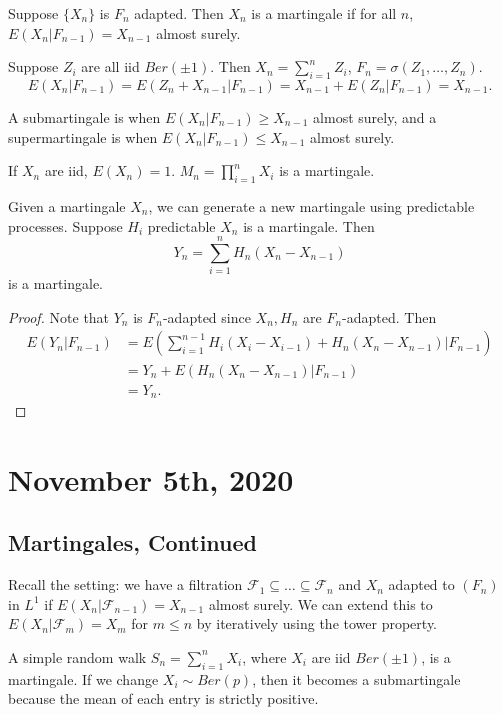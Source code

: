 \documentclass[11pt]{scrartcl}
\let \mc \mathcal
\begin{document}
\begin{definition} Suppose $\{X_n\}$ is $F_n$ adapted.  Then $X_n$ is a martingale if for all $n$, $E(X_n|F_{n-1}) = X_{n-1}$ almost surely.
\end{definition}
\begin{example}  Suppose $Z_i$ are all iid $Ber(\pm 1)$.  Then $X_n = \sum_{i=1}^n Z_i$, $F_n = \sigma(Z_1, \dots, Z_n)$.  
$$E(X_n|F_{n-1}) = E(Z_n + X_{n-1}|F_{n-1}) = X_{n-1} + E(Z_n|F_{n-1}) = X_{n-1}.$$
\end{example}

\begin{definition} A submartingale is when $E(X_n|F_{n-1}) \ge X_{n-1}$ almost surely, and a supermartingale is when $E(X_n | F_{n-1}) \le X_{n-1}$ almost surely.
\end{definition}
\begin{example} If $X_n$ are iid, $E(X_n) = 1$.  $M_n = \prod_{i=1}^n X_i$ is a martingale.
\end{example}
\begin{thm}
Given a martingale $X_n$, we can generate a new martingale using predictable processes.  Suppose $H_i$ predictable $X_n$ is a martingale.  Then $$Y_n = \sum_{i=1}^n H_n(X_n - X_{n-1})$$ is a martingale.
\end{thm}
\begin{proof}
Note that $Y_n$ is $F_n$-adapted since $X_n, H_n$ are $F_n$-adapted.  Then 
\begin{align*}
E(Y_n|F_{n-1}) &= E(\sum_{i=1}^{n-1} H_i(X_i - X_{i-1}) + H_n(X_n - X_{n-1}) | F_{n-1}) \\
&= Y_n + E(H_n(X_n - X_{n-1}) | F_{n-1}) \\
&= Y_n.
\end{align*}
\end{proof}
\pagebreak
\section{November 5th, 2020}
\subsection{Martingales, Continued}
Recall the setting: we have a filtration $\mc F_1 \subseteq \dots \subseteq \mc F_n$ and $X_n$ adapted to $(F_n)$ in $L^1$ if $E(X_n|\mc F_{n-1}) = X_{n-1}$ almost surely.  We can extend this to $E(X_n|\mc F_m) = X_m$ for $m \le n$ by iteratively using the tower property.

\begin{example} A simple random walk $S_n = \sum_{i=1}^n X_i$, where $X_i$ are iid $Ber(\pm 1)$, is a martingale.  If we change $X_i \sim Ber(p)$, then it becomes a submartingale because the mean of each entry is strictly positive.  
\end{example}
\end{document}
